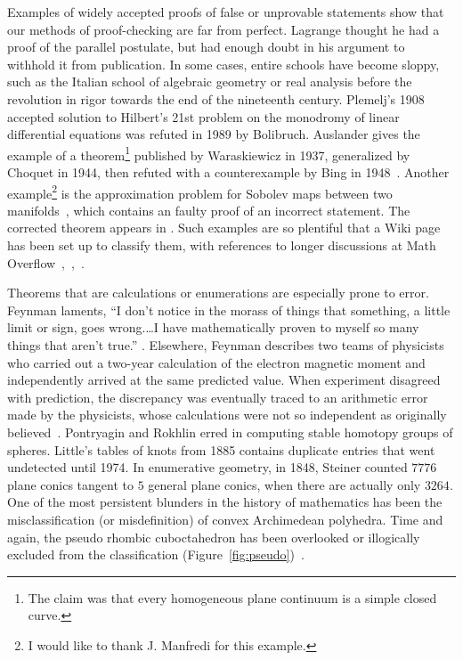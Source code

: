 \documentclass{llncs}
\begin{document}
Examples of widely accepted proofs of false or unprovable statements
show that our methods of proof-checking are far from perfect.    Lagrange
thought he had a proof of the parallel postulate, but had enough doubt
in his argument to withhold it from publication.  In some cases,
entire schools have become sloppy, such as the Italian school of
algebraic geometry or real analysis before the revolution in rigor
towards the end of the nineteenth century.  Plemelj's 1908 accepted
solution to Hilbert's 21st problem on the monodromy of linear
differential equations was refuted in 1989 by Bolibruch.  Auslander
gives the example of a theorem\footnote{The claim was that every
  homogeneous plane continuum is a simple closed curve.}  published by
Waraskiewicz in 1937, generalized by Choquet in 1944, then refuted
with a counterexample by Bing in 1948~\cite{Aus}.  Another
example\footnote{I would like to thank J. Manfredi for this example.}
is the approximation problem for Sobolev maps between two
manifolds~\cite{Bethuel}, which contains an faulty proof of an
incorrect statement.  The corrected theorem appears in \cite{Hang}.
Such examples are so plentiful that a Wiki
page has been set up to classify them, with references to longer discussions
at Math Overflow~\cite{WikiPIP},~\cite{Over2},~\cite{Over1}.


Theorems that are calculations or enumerations are especially prone to
error.  Feynman laments, ``I don't notice in the morass of things that something, a
little limit or sign, goes wrong.\dots I have mathematically proven to myself
so many things that aren't true.''
\cite[p.~885]{FeCo}. Elsewhere, Feynman describes two teams of
physicists who carried out a two-year calculation of the electron
magnetic moment and independently arrived at the same predicted value.
When experiment disagreed with prediction, the discrepancy was
eventually traced to an arithmetic error made by the physicists, whose
calculations were not so independent as originally
believed~\cite[p.~117]{FQED}.  Pontryagin and Rokhlin erred in
computing stable homotopy groups of spheres.  Little's tables of knots
from 1885 contains duplicate entries that went undetected until 1974.
In enumerative geometry, in 1848, Steiner counted $7776$ plane conics
tangent to $5$ general plane conics, when there are actually only
$3264$.  One of the most persistent blunders in the history of
mathematics has been the misclassification (or misdefinition) of
convex Archimedean polyhedra.  Time and again, the
pseudo rhombic cuboctahedron has been overlooked or illogically excluded
from the classification (Figure~\ref{fig:pseudo})~\cite{Gr11}.
\end{document}
